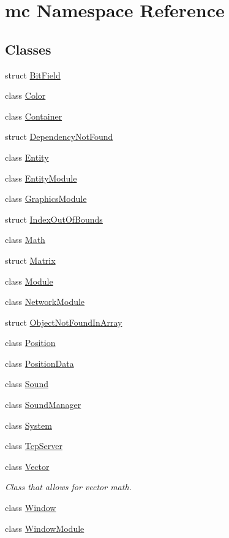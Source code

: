 \hypertarget{namespacemc}{}\section{mc Namespace Reference}
\label{namespacemc}
\subsection*{Classes}
\begin{DoxyCompactItemize}
\item 
struct \hyperlink{structmc_1_1_bit_field}{Bit\+Field}
\item 
class \hyperlink{classmc_1_1_color}{Color}
\item 
class \hyperlink{classmc_1_1_container}{Container}
\item 
struct \hyperlink{structmc_1_1_dependency_not_found}{Dependency\+Not\+Found}
\item 
class \hyperlink{classmc_1_1_entity}{Entity}
\item 
class \hyperlink{classmc_1_1_entity_module}{Entity\+Module}
\item 
class \hyperlink{classmc_1_1_graphics_module}{Graphics\+Module}
\item 
struct \hyperlink{structmc_1_1_index_out_of_bounds}{Index\+Out\+Of\+Bounds}
\item 
class \hyperlink{classmc_1_1_math}{Math}
\item 
struct \hyperlink{structmc_1_1_matrix}{Matrix}
\item 
class \hyperlink{classmc_1_1_module}{Module}
\item 
class \hyperlink{classmc_1_1_network_module}{Network\+Module}
\item 
struct \hyperlink{structmc_1_1_object_not_found_in_array}{Object\+Not\+Found\+In\+Array}
\item 
class \hyperlink{classmc_1_1_position}{Position}
\item 
class \hyperlink{classmc_1_1_position_data}{Position\+Data}
\item 
class \hyperlink{classmc_1_1_sound}{Sound}
\item 
class \hyperlink{classmc_1_1_sound_manager}{Sound\+Manager}
\item 
class \hyperlink{classmc_1_1_system}{System}
\item 
class \hyperlink{classmc_1_1_tcp_server}{Tcp\+Server}
\item 
class \hyperlink{classmc_1_1_vector}{Vector}
\begin{DoxyCompactList}\small\item\em Class that allows for vector math. \end{DoxyCompactList}\item 
class \hyperlink{classmc_1_1_window}{Window}
\item 
class \hyperlink{classmc_1_1_window_module}{Window\+Module}
\end{DoxyCompactItemize}
